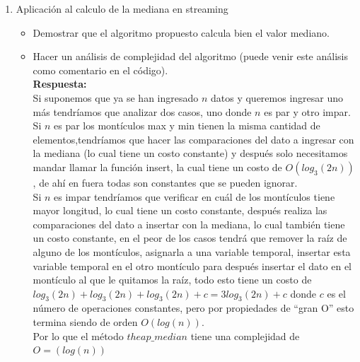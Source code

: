 \documentclass[11pt]{article}
\begin{document}
\begin{enumerate}
\begin{itemize}
\end{itemize}

\item Aplicación al calculo de la mediana en streaming
\begin{itemize}
\item Demostrar que el algoritmo propuesto calcula bien el valor mediano.
\item Hacer un análisis de complejidad del algoritmo (puede venir este análisis como comentario en el
código).
\\
\textbf{Respuesta:}
\\

Si suponemos que ya se han ingresado $n$ datos y queremos ingresar uno más tendríamos que analizar dos casos, uno donde $n$ es par y otro impar.\\
Si  $n$ es par los montículos max y min tienen la misma cantidad de elementos,tendríamos que hacer las comparaciones del dato a ingresar con la mediana (lo cual tiene un costo constante) y después solo necesitamos mandar llamar la función insert, la cual tiene un costo de $O(log_3 (2n))$, de ahí en fuera todas son constantes que se pueden ignorar. 
\\
Si $n$ es impar tendríamos que verificar en cuál de los montículos tiene mayor longitud, lo cual tiene un costo constante, después realiza las comparaciones del dato a insertar con la mediana, lo cual también tiene un costo constante, en el peor de los casos tendrá que remover la raíz de alguno de los montículos, asignarla a una variable temporal, insertar esta variable temporal en el otro montículo para después insertar el dato en el montículo al que le quitamos la raíz, todo esto tiene un costo de $log_3(2n)+log_3(2n)+log_3(2n)+c=3log_3(2n)+c$ donde $c$ es el número de operaciones constantes, pero por propiedades de “gran O” esto termina siendo de orden $O(log(n))$.
\\ 
Por lo que el método $theap\_median$ tiene una complejidad de $O=(log(n))$

\end{itemize}
\end{enumerate}
\end{document}
